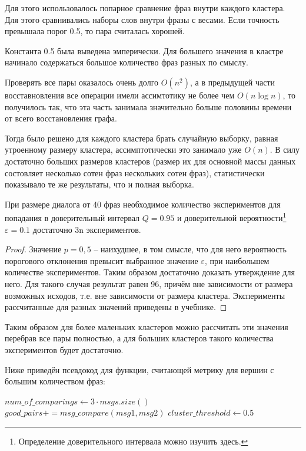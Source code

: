 \documentclass[specification,annotation]{itmo-student-thesis}
\begin{document}
	Для этого использовалось попарное сравнение фраз внутри каждого кластера. Для этого сравнивались наборы слов внутри фразы с весами. Если точность превышала порог 0.5, то пара считалась хорошей.
	
	Константа 0.5 была выведена эмперически. Для большего значения в кластре начинало содержаться большое количество фраз разных по смыслу. 
	
	Проверять все пары оказалось очень долго $O(n^2)$, а в предыдущей части восставновления все операции имели ассимтотику не более чем $O(n \log n)$, то получилось так, что эта часть занимала значительно больше половины времени от всего восстановления графа. 
	
	Тогда было решено для каждого кластера брать случайную выборку, равная утроенному размеру кластера, ассимптотически это занимало уже $O(n)$. В силу достаточно больших размеров кластеров (размер их для основной массы данных состовляет несколько сотен фраз нескольких сотен фраз), статистически показывало те же результаты, что и полная выборка.
	
	\begin{prop}
		При размере диалога от 40 фраз необходимое количество экспериментов для попадания в доверительный интервал $Q=0.95$ и доверительной вероятности\footnote{Определение доверительного интервала можно изучить здесь.\cite{чернова2007теория}} $\varepsilon=0.1$ достаточно 3n экспериментов.
	\end{prop}
	\begin{proof}
		Значение $p=0,5$ -- наихудшее, в том смысле, что для него вероятность порогового отклонения превысит выбранное значение $\varepsilon$, при наибольшем количестве экспериментов. Таким образом достаточно доказать утверждение для него. Для такого случая результат равен 96, причём вне зависимости от размера возможных исходов, т.е. вне зависимости от размера кластера. Эксперименты рассчитанные для разных значений приведены в учебнике.\cite{мухинмоделирование}
	\end{proof}
	
	Таким образом для более маленьких кластеров можно рассчитать эти значения перебрав все пары полностью, а для больших кластеров такого количества экспериментов будет достаточно.
	
	Ниже приведён псевдокод для функции, считающей метрику для вершин с большим количеством фраз:
	
	\begin{algorithmic}
			\State $num\_of\_comparings \gets 3 \cdot msgs.size()$
				\State $good\_pairs += msg\_compare(msg1, msg2)$
			\EndFor
			\State $cluster\_threshold \gets 0.5$
			\State {}
		\EndFunction
	\end{algorithmic}
\end{document}
